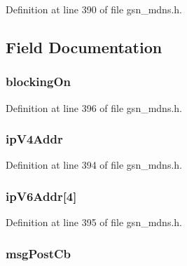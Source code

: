 Definition at line 390 of file gsn\_\-mdns.h.



\subsection{Field Documentation}
\hypertarget{a00144_ae88d491fc834aaae7cc9c066719d285b}{
\subsubsection[{blockingOn}]{ {\bf blockingOn}}}
\label{a00144_ae88d491fc834aaae7cc9c066719d285b}


Definition at line 396 of file gsn\_\-mdns.h.

\hypertarget{a00144_a62b6631d984cc1ac01c45f3a4891520c}{
\subsubsection[{ipV4Addr}]{ {\bf ipV4Addr}}}
\label{a00144_a62b6631d984cc1ac01c45f3a4891520c}


Definition at line 394 of file gsn\_\-mdns.h.

\hypertarget{a00144_aefd5b2db3c171f6f8eeeb613e7eaf709}{
\subsubsection[{ipV6Addr}]{ {\bf ipV6Addr}\mbox{[}4\mbox{]}}}
\label{a00144_aefd5b2db3c171f6f8eeeb613e7eaf709}


Definition at line 395 of file gsn\_\-mdns.h.

\hypertarget{a00144_a6adb3a11c7d8acfbd87e34dca64c8117}{
\subsubsection[{msgPostCb}]{ {\bf msgPostCb}}}
\label{a00144_a6adb3a11c7d8acfbd87e34dca64c8117}


